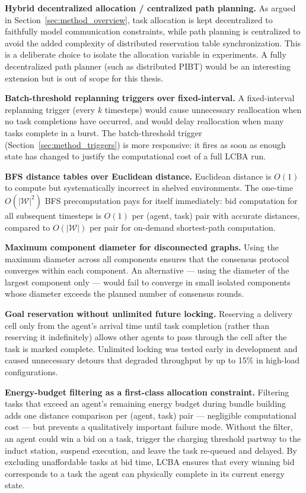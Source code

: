 \textbf{Hybrid decentralized allocation / centralized path planning.}
As argued in Section~\ref{sec:method_overview}, task allocation is kept
decentralized to faithfully model communication constraints, while path planning
is centralized to avoid the added complexity of distributed reservation table
synchronization.
This is a deliberate choice to isolate the allocation variable in experiments.
A fully decentralized path planner (such as distributed PIBT) would be an
interesting extension but is out of scope for this thesis.

\textbf{Batch-threshold replanning triggers over fixed-interval.}
A fixed-interval replanning trigger (every $k$ timesteps) would cause
unnecessary reallocation when no task completions have occurred, and would
delay reallocation when many tasks complete in a burst.
The batch-threshold trigger (Section~\ref{sec:method_triggers}) is more
responsive: it fires as soon as enough state has changed to justify the
computational cost of a full LCBA run.

\textbf{BFS distance tables over Euclidean distance.}
Euclidean distance is $O(1)$ to compute but systematically incorrect in
shelved environments.
The one-time $O(|\mathcal{W}|^2)$ BFS precomputation pays for itself
immediately: bid computation for all subsequent timesteps is $O(1)$
per (agent, task) pair with accurate distances, compared to $O(|\mathcal{W}|)$
per pair for on-demand shortest-path computation.

\textbf{Maximum component diameter for disconnected graphs.}
Using the maximum diameter across all components ensures that the consensus
protocol converges within each component.
An alternative --- using the diameter of the largest component only --- would
fail to converge in small isolated components whose diameter exceeds the
planned number of consensus rounds.

\textbf{Goal reservation without unlimited future locking.}
Reserving a delivery cell only from the agent's arrival time until task
completion (rather than reserving it indefinitely) allows other agents to pass
through the cell after the task is marked complete.
Unlimited locking was tested early in development and caused unnecessary
detours that degraded throughput by up to 15\% in high-load configurations.

\textbf{Energy-budget filtering as a first-class allocation constraint.}
Filtering tasks that exceed an agent's remaining energy budget during bundle
building adds one distance comparison per (agent, task) pair --- negligible
computational cost --- but prevents a qualitatively important failure mode.
Without the filter, an agent could win a bid on a task, trigger the charging
threshold partway to the induct station, suspend execution, and leave the
task re-queued and delayed.
By excluding unaffordable tasks at bid time, LCBA ensures that every winning
bid corresponds to a task the agent can physically complete in its current
energy state.

